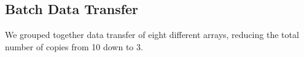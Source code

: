 \subsection*{Batch Data Transfer}
We grouped together data transfer of eight different arrays,  reducing the total number of copies from 10 down to 3.